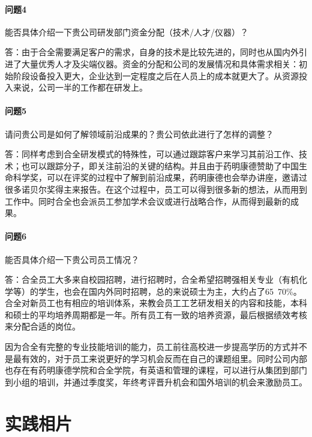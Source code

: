 \documentclass[twocolumn]{ctexbook}
\begin{document}
	\paragraph{问题4}能否具体介绍一下贵公司研发部门资金分配（技术/人才/仪器）？
	
	答：由于合全需要满足客户的需求，自身的技术是比较先进的，同时也从国内外引进了大量优秀人才及尖端仪器。资金的分配和公司的发展情况和具体需求相关：初始阶段设备投入更大，企业达到一定程度之后在人员上的成本就更大了。从资源投入来说，公司一半的工作都在研发上。
	
	\paragraph{问题5}请问贵公司是如何了解领域前沿成果的？贵公司依此进行了怎样的调整？
	
	答：同样考虑到合全研发模式的特殊性，可以通过跟踪客户来学习其前沿工作、技术；也可以跟踪分子，即关注前沿的关键的结构。并且由于药明康德赞助了中国生命科学奖，可以在评奖的过程中了解到前沿成果，药明康德也会举办讲座，邀请过很多诺贝尔奖得主来报告。在这个过程中，员工可以得到很多新的想法，从而用到工作中。同时合全也会派员工参加学术会议或进行战略合作，从而得到最新的成果。
	
	\paragraph{问题6}能否具体介绍一下贵公司员工情况？
	
	答：合全员工大多来自校园招聘，进行招聘时，合全希望招聘强相关专业（有机化学等）的学生，也会在国内外同时招聘，总的来说硕士为主，大约占了65~70\%。合全对新员工也有相应的培训体系，来教会员工工艺研发相关的内容和技能，本科和硕士的平均培养周期都是一年。所有员工有一致的培养资源，最后根据绩效考核来分配合适的岗位。
	
	因为合全有完整的专业技能培训的能力，员工前往高校进一步提高学历的方式并不是最有效的，对于员工来说更好的学习机会反而在自己的课题组里。同时公司内部也存在有药明康德学院和合全学院，有英语和管理的课程，可以进行从集团到部门到小组的培训，并通过季度奖，年终考评晋升机会和国外培训的机会来激励员工。
	
	
	\newpage
	
	\section*{实践相片}
	
\end{document}
